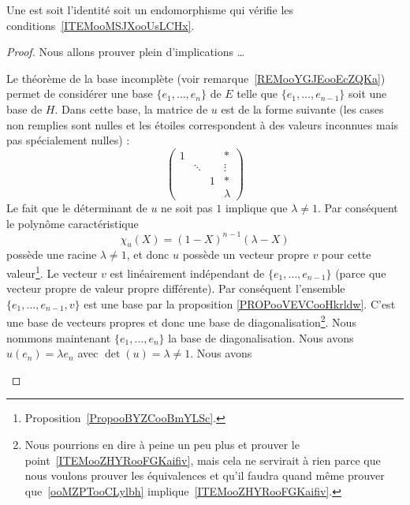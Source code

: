 \begin{theoremDef}
	Une  est soit l'identité soit un endomorphisme qui vérifie les conditions~\ref{ITEMooMSJXooUsLCHx}.

\end{theoremDef}



\begin{proof}
	Nous allons prouver plein d'implications \ldots
	\begin{subproof}
		Le théorème de la base incomplète (voir remarque~\ref{REMooYGJEooEcZQKa}) permet de considérer une base \( \{ e_1,\ldots, e_n \}\) de \( E\) telle que \( \{ e_1,\ldots, e_{n-1} \} \) soit une base de \( H\). Dans cette base, la matrice de \( u\) est de la forme suivante (les cases non remplies sont nulles et les étoiles correspondent à des valeurs inconnues mais pas spécialement nulles) :
		\begin{equation}        \label{EqooPQOEooGUyIwa}
			\begin{pmatrix}
				1 &        &   & *       \\
				  & \ddots &   & \vdots  \\
				  &        & 1 & *       \\
				  &        &   & \lambda
			\end{pmatrix}
		\end{equation}
		Le fait que le déterminant de \( u\) ne soit pas \( 1\) implique que \( \lambda\neq 1\). Par conséquent le polynôme caractéristique
		\begin{equation}
			\chi_u(X)=(1-X)^{n-1}(\lambda-X)
		\end{equation}
		possède une racine \( \lambda\neq 1\), et donc \( u\) possède un vecteur propre \( v\) pour cette valeur\footnote{Proposition~\ref{PropooBYZCooBmYLSc}.}. Le vecteur \( v\) est linéairement indépendant de \( \{ e_1,\ldots, e_{n-1} \}\) (parce que vecteur propre de valeur propre différente). Par conséquent l'ensemble \( \{ e_1,\ldots, e_{n-1},v \}\) est une base par la proposition \ref{PROPooVEVCooHkrldw}. C'est une base de vecteurs propres et donc une base de diagonalisation\footnote{Nous pourrions en dire à peine un peu plus et prouver le point~\ref{ITEMooZHYRooFGKaifiv}, mais cela ne servirait à rien parce que nous voulons prouver les équivalences et qu'il faudra quand même prouver que~\ref{ooMZPTooCLylbh} implique~\ref{ITEMooZHYRooFGKaifiv}.}.
		Nous nommons maintenant \( \{ e_1,\ldots, e_{n} \}\) la base de diagonalisation. Nous avons \( u(e_n)=\lambda e_n\) avec \( \det(u)=\lambda\neq 1\). Nous avons

\end{subproof}
\end{proof}
